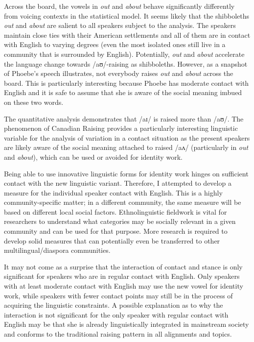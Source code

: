\documentclass[output=paper]{langscibook}
\begin{document}
Across the board, the vowels in \textit{out} and \textit{about} behave significantly differently from voicing contexts in the statistical model. It seems likely that the shibboleths \textit{out} and \textit{about} are salient to all speakers subject to the analysis. The speakers maintain close ties with their American settlements and all of them are in contact with English to varying degrees (even the most isolated ones still live in a community that is surrounded by English). Potentially, \textit{out} and \textit{about} accelerate the language change towards /aʊ/-raising as shibboleths. However, as a snapshot of Phoebe’s speech illustrates, not everybody raises \textit{out} and \textit{about} across the board. This is particularly interesting because Phoebe has moderate contact with English and it is safe to assume that she is aware of the social meaning imbued on these two words. 

The quantitative analysis demonstrates that /aɪ/ is raised more than /aʊ/. The phenomenon of Canadian Raising provides a particularly interesting linguistic variable for the analysis of variation in a contact situation as the present speakers are likely aware of the social meaning attached to raised /aʌ/ (particularly in \textit{out} and \textit{about}), which can be used or avoided for identity work. 

Being able to use innovative linguistic forms for identity work hinges on sufficient contact with the new linguistic variant. Therefore, I attempted to develop a measure for the individual speaker contact with English. This is a highly commu\-nity-specific matter; in a different community, the same measure will be based on different local social factors. Ethnolinguistic fieldwork is vital for researchers to understand what categories may be socially relevant in a given community and can be used for that purpose. More research is required to develop solid measures that can potentially even be transferred to other multilingual/diaspora communities.

It may not come as a surprise that the interaction of contact and stance is only significant for speakers who are in regular contact with English. Only speakers with at least moderate contact with English may use the new vowel for identity work, while speakers with fewer contact points may still be in the process of acquiring the linguistic constraints. A possible explanation as to why the interaction is not significant for the only speaker with regular contact with English may be that she is already linguistically integrated in mainstream society and conforms to the traditional raising pattern in all alignments and topics.
\end{document}
